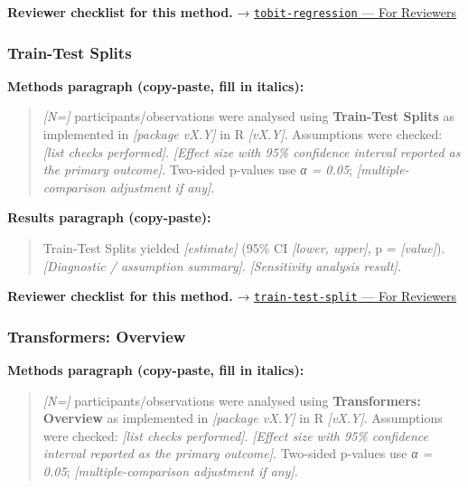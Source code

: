 \documentclass[
]{article}
\begin{document}
\textbf{Reviewer checklist for this method.} →
\href{../chapters/07-regression/tobit-regression.Rmd\#for-reviewers}{\texttt{tobit-regression}
--- For Reviewers}

\subsubsection{Train-Test Splits}\label{train-test-splits}

\textbf{Methods paragraph (copy-paste, fill in italics):}

\begin{quote}
\emph{{[}N={]}} participants/observations were analysed using
\textbf{Train-Test Splits} as implemented in \emph{{[}package vX.Y{]}}
in R \emph{{[}vX.Y{]}}. Assumptions were checked: \emph{{[}list checks
performed{]}}. \emph{{[}Effect size with 95\% confidence interval
reported as the primary outcome{]}}. Two-sided p-values use \emph{α =
0.05}; \emph{{[}multiple-comparison adjustment if any{]}}.
\end{quote}

\textbf{Results paragraph (copy-paste):}

\begin{quote}
Train-Test Splits yielded \emph{{[}estimate{]}} (95\% CI \emph{{[}lower,
upper{]}}, p = \emph{{[}value{]}}). \emph{{[}Diagnostic / assumption
summary{]}}. \emph{{[}Sensitivity analysis result{]}}.
\end{quote}

\textbf{Reviewer checklist for this method.} →
\href{../chapters/13-ml/train-test-split.Rmd\#for-reviewers}{\texttt{train-test-split}
--- For Reviewers}

\subsubsection{Transformers: Overview}\label{transformers-overview}

\textbf{Methods paragraph (copy-paste, fill in italics):}

\begin{quote}
\emph{{[}N={]}} participants/observations were analysed using
\textbf{Transformers: Overview} as implemented in \emph{{[}package
vX.Y{]}} in R \emph{{[}vX.Y{]}}. Assumptions were checked: \emph{{[}list
checks performed{]}}. \emph{{[}Effect size with 95\% confidence interval
reported as the primary outcome{]}}. Two-sided p-values use \emph{α =
0.05}; \emph{{[}multiple-comparison adjustment if any{]}}.
\end{quote}
\end{document}
